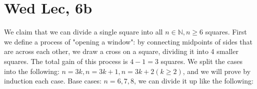 \documentclass[12pt]{article}
\newcommand{\N}{\mathbb{N}}
\begin{document}
\section{Wed Lec, 6b}
We claim that we can divide a single square into all $n \in \N, n \geq 6$ squares.
\newline
First we define a process of "opening a window": by connecting midpoints of sides that are across each other, we draw a cross on a square, dividing it into 4 smaller squares. The total gain of this process is $4-1=3$ squares.
\newline
We split the cases into the following: $n = 3k, n = 3k+1, n = 3k+2 (k \geq 2)$, and we will prove by induction each case.
\newline
Base cases: $n = 6, 7, 8$, we can divide it up like the following:
\newline
\end{document}
